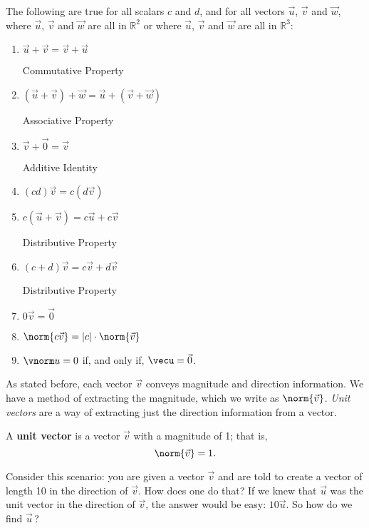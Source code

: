 {The following are true for all scalars $c$ and $d$, and for all vectors $\vec u$, $\vec v$ and $\vec w$, where $\vec u$, $\vec v$ and $\vec w$ are all in $\mathbb{R}^2$ or where $\vec u$, $\vec v$ and $\vec w$ are all in $\mathbb{R}^3$:
\begin{enumerate}
	\item \parbox{150pt}{$\vec u+\vec v = \vec v+\vec u$}Commutative Property
	\item \parbox{150pt}{$(\vec u+\vec v)+\vec w = \vec u+(\vec v+\vec w)$}Associative Property
	\item \parbox{150pt}{$\vec v+\vec 0 = \vec v$}Additive Identity
	\item \parbox{150pt}{$(cd)\vec v= c(d\vec v)$}
	\item \parbox{150pt}{$c(\vec u+\vec v) = c\vec u+c\vec v$}Distributive Property
	\item \parbox{150pt}{$(c+d)\vec v = c\vec v+d\vec v$}Distributive Property
	\item \parbox{150pt}{$0\vec v = \vec 0$}
	\item	\parbox{150pt}{$\norm{c\vec v} = |c|\cdot\norm{\vec v}$}\label{thm:norm_prop}
	\item	$\vnorm u = 0$ if, and only if, $\vecu = \vec 0$.  \label{thm:zero_norm}
\end{enumerate}
}

%

As stated before, each vector $\vec v$ conveys magnitude and direction information. We have a method of extracting the magnitude, which we write as $\norm{\vec v}$. \textit{Unit vectors} are a way of extracting just the direction information from a vector.

{A \textbf{unit vector} is a vector $\vec v$ with a magnitude of 1; that is, 
$$\norm{\vec v}=1.$$
}

Consider this scenario: you are given a vector $\vec v$ and are told to create a vector of length 10 in the direction of $\vec v$. How does one do that? If we knew that $\vec u$ was the unit vector in the direction of $\vec v$, the answer would be easy: $10\vec u$. So how do we find $\vec u$\,?

